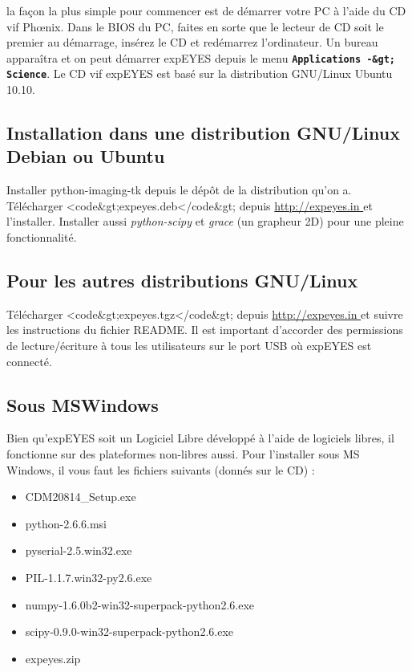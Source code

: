 \documentclass{book}
\newcommand{\nop}{}
\begin{document}
la façon la plus simple pour commencer est de démarrer votre PC à l'aide du CD vif Phœnix. Dans le BIOS du PC, faites en sorte que le lecteur de CD soit le premier au démarrage, insérez le CD et redémarrez l'ordinateur. Un bureau apparaîtra et on peut démarrer expEYES depuis le menu  \texttt{\textbf{Applications -\&gt; Science}\nop}. Le CD vif expEYES est basé sur la distribution GNU/Linux Ubuntu 10.10.




\subsection{Installation dans une distribution GNU/Linux Debian ou Ubuntu}





Installer python-imaging-tk depuis le dépôt de la distribution qu'on a. Télécharger <code\&gt;expeyes.deb</code\&gt; depuis \href{http://expeyes.in }{\mbox{http://expeyes.in} } et l'installer. Installer aussi \emph{python-scipy} et \emph{grace} (un grapheur 2D) pour une pleine fonctionnalité.




\subsection{Pour les autres distributions GNU/Linux}





Télécharger <code\&gt;expeyes.tgz</code\&gt; depuis \href{http://expeyes.in }{\mbox{http://expeyes.in} } et suivre les instructions du fichier README. Il est important d’accorder des permissions de lecture/écriture à tous les utilisateurs sur le port USB où expEYES est connecté.




\subsection{Sous MSWindows}





Bien qu'expEYES soit un Logiciel Libre développé à l'aide de logiciels libres, il fonctionne sur des plateformes non-libres aussi. Pour l'installer sous MS Windows, il vous faut les fichiers suivants (donnés sur le CD) :
\begin{itemize}
  \item CDM20814\_Setup.exe
  \item python-2.6.6.msi
  \item pyserial-2.5.win32.exe
  \item PIL-1.1.7.win32-py2.6.exe
  \item numpy-1.6.0b2-win32-superpack-python2.6.exe
  \item scipy-0.9.0-win32-superpack-python2.6.exe
  \item expeyes.zip
\end{itemize}
\end{document}
